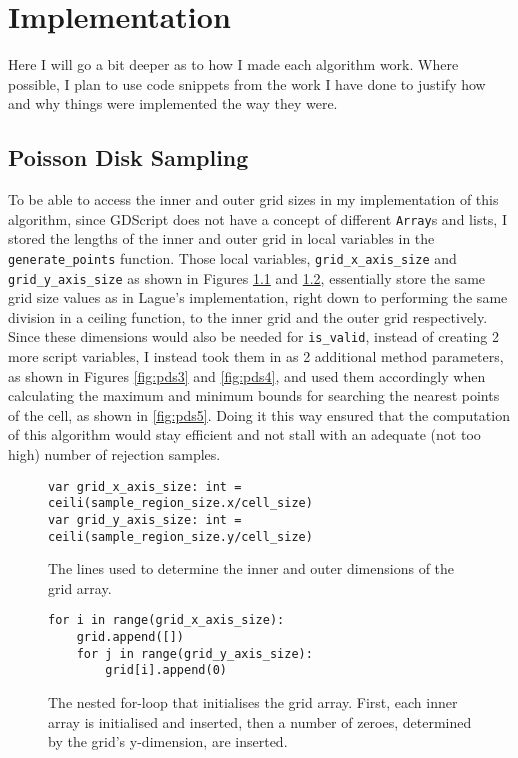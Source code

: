 \chapter{Implementation}


Here I will go a bit deeper as to how I made each algorithm work. Where possible, I plan to use code snippets from the work I have done to justify how and why things were implemented the way they were.

\section{Poisson Disk Sampling}

To be able to access the inner and outer grid sizes in my implementation of this algorithm, since GDScript does not have a concept of different \verb|Array|s and lists, I stored the lengths of the inner and outer grid in local variables in the \verb|generate_points| function. Those local variables, \verb|grid_x_axis_size| and \verb|grid_y_axis_size| as shown in Figures \ref{fig:pds1} and \ref{fig:pds2}, essentially store the same grid size values as in Lague's implementation, right down to performing the same division in a ceiling function, to the inner grid and the outer grid respectively. Since these dimensions would also be needed for \verb|is_valid|, instead of creating 2 more script variables, I instead took them in as 2 additional method parameters, as shown in Figures \ref{fig:pds3} and \ref{fig:pds4}, and used them accordingly when calculating the maximum and minimum bounds for searching the nearest points of the cell, as shown in \ref{fig:pds5}. Doing it this way ensured that the computation of this algorithm would stay efficient and not stall with an adequate (not too high) number of rejection samples.

\begin{figure}[H]
    \centering
    \begin{lstlisting}
var grid_x_axis_size: int = ceili(sample_region_size.x/cell_size)
var grid_y_axis_size: int = ceili(sample_region_size.y/cell_size)
    \end{lstlisting}
    \caption{The lines used to determine the inner and outer dimensions of the grid array.}
    \label{fig:pds1}
\end{figure}

\begin{figure}[H]
    \centering
    \begin{lstlisting}
for i in range(grid_x_axis_size):
	grid.append([])
	for j in range(grid_y_axis_size):
		grid[i].append(0)
    \end{lstlisting}
    \caption{The nested for-loop that initialises the grid array. First, each inner array is initialised and inserted, then a number of zeroes, determined by the grid's y-dimension, are inserted.}
    \label{fig:pds2}
\end{figure}

